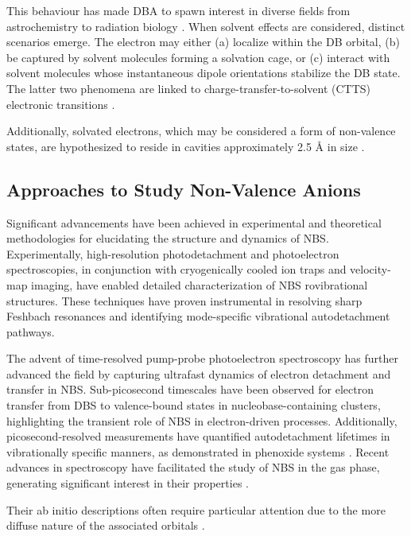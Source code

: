 This behaviour has made DBA to spawn interest in diverse fields from astrochemistry \cite{fortenberry2015interstellar} to radiation biology \cite{narayanan2023secondary,sedmidubska2024interaction}. 
When solvent effects are considered, distinct scenarios emerge. The electron may either (a) localize within the DB orbital, (b) be captured by solvent molecules forming a solvation cage, or (c) interact with solvent molecules whose instantaneous dipole orientations stabilize the DB state. The latter two phenomena are linked to charge-transfer-to-solvent (CTTS) electronic transitions \cite{bradforth2002excited,chen2000precursors}.

Additionally, solvated electrons, which may be considered a form of non-valence states, are hypothesized to reside in cavities approximately 2.5 \r{A} in size \cite{herbert2017hydrated}.

\subsection{Approaches to Study Non-Valence Anions}
Significant advancements have been achieved in experimental and theoretical methodologies for elucidating the structure and dynamics of NBS. Experimentally, high-resolution photodetachment and photoelectron spectroscopies, in conjunction with cryogenically cooled ion traps and velocity-map imaging, have enabled detailed characterization of NBS rovibrational structures. These techniques have proven instrumental in resolving sharp Feshbach resonances and identifying mode-specific vibrational autodetachment pathways.

The advent of time-resolved pump-probe photoelectron spectroscopy has further advanced the field by capturing ultrafast dynamics of electron detachment and transfer in NBS. Sub-picosecond timescales have been observed for electron transfer from DBS to valence-bound states in nucleobase-containing clusters, highlighting the transient role of NBS in electron-driven processes. Additionally, picosecond-resolved measurements have quantified autodetachment lifetimes in vibrationally specific manners, as demonstrated in phenoxide systems \cite{jordan2003theory,paran2024performance}.
Recent advances in spectroscopy have facilitated the study of NBS in the gas phase, generating significant interest in their properties \cite{kang2024reaction}. 

Their ab initio descriptions often require particular attention due to the more diffuse nature of the associated orbitals \cite{simons2008molecular,simons2023molecular}. 

